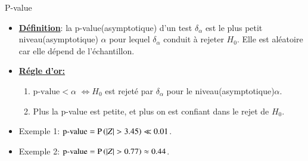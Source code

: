 \begin{frame}
    [allowframebreaks]{P-value}
    \begin{itemize}
        \item \textbf{\underline{Définition}}: la p-value(asymptotique) d'un test $\delta_\alpha$ est le plus petit niveau(asymptotique)
         $\alpha$ pour lequel $\delta_\alpha$ conduit à rejeter $H_0$. Elle est aléatoire car elle dépend de l'échantillon.
         \item \textbf{\underline{Régle d'or:}} \begin{enumerate}[-]
             \item $\text{p-value} < \alpha$ $\Leftrightarrow H_0$ est rejeté par $\delta_\alpha$ pour le niveau(asymptotique)$\alpha$.
             \item Plus la p-value est petite, et plus on est confiant dans le rejet de $H_0$.
         \end{enumerate}
         \item Exemple 1: $\text{p-value} =\operatorname{P}\left(\left\vert {Z} \right\vert>3.45\right)\ll 0.01$. 
         \item Exemple 2: $\text{p-value} =\operatorname{P}\left(\left\vert {Z} \right\vert>0.77\right)\approx 0.44$. 
    \end{itemize}
\end{frame}
